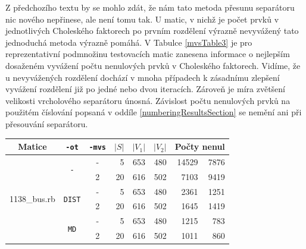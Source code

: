 \documentclass{ctuthesis}
\theoremstyle{plain}
\theoremstyle{definition}
\begin{document}
Z předchozího textu by se mohlo zdát, že nám tato metoda přesunu separátoru nic nového nepřinese, ale není tomu tak. U matic, v nichž je počet prvků v jednotlivých Choleského faktorech po prvním rozdělení výrazně nevyvážený tato jednoduchá metoda výrazně pomáhá. V Tabulce \ref{mvsTable3} je pro reprezentativní podmnožinu testovacích matic zanesena informace o nejlepším dosaženém vyvážení počtu nenulových prvků v Choleského faktorech. Vidíme, že u nevyvážených rozdělení dochází v mnoha případech k zásadnímu zlepšení vyvážení rozdělení již po jedné nebo dvou iteracích. Zároveň je míra zvětšení velikosti vrcholového separátoru únosná. Závislost počtu nenulových prvků na použitém číslování popsaná v oddíle \ref{numberingResultsSection} se nemění ani při přesouvání separátoru.

\bigskip
{\noindent
  \footnotesize
  \centering
  \renewcommand{\arraystretch}{1.1}
\begin{tabular}{|l|c|c|r|r|r|r|r|}
  \hline
  \multicolumn{1}{|c|}{Matice} & \multicolumn{1}{|c|}{\texttt{-ot}}  &\multicolumn{1}{|c|}{\texttt{-mvs}} &\multicolumn{1}{|c|}{$|S|$} & \multicolumn{1}{|c|}{$|V_1|$}& \multicolumn{1}{|c|}{$|V_2|$} & \multicolumn{2}{c|}{Počty nenul} \\
	\hline
	\multirow{8}{*}{1138\_bus.rb}
	& \multirow{2}{*}{\texttt{-}}
  	& -	& 5	  & 653 & 480 & 14529	&	7876	\\
	& & 2	&	20	&	616	&	502	&	7103	&	9419	\\

  & \multirow{2}{*}{\texttt{DIST}}
  	& -	& 5	  & 653 & 480 &	2361	&	1251	\\
	& & 2	&	20	&	616	&	502	&	1645	&	1419	\\

  & \multirow{2}{*}{\texttt{MD}}
	  & -	& 5	  & 653 & 480 &	1215	&	783 \\
	& & 2	&	20	&	616	&	502	&	1011	&	860	\\


\end{tabular}}
\end{document}
